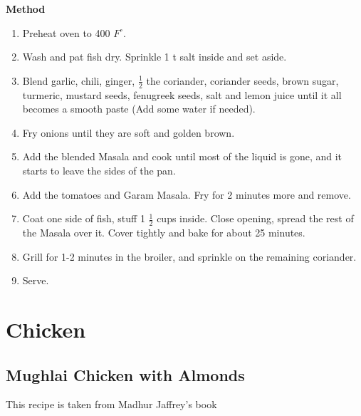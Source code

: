 {\bf Method}
\begin{enumerate}
\item Preheat oven to 400 $F^\circ$.
\item Wash and pat fish dry. Sprinkle 1 t salt inside and set aside.
\item Blend garlic, chili, ginger, $\frac{1}{2}$ the coriander, coriander seeds, brown
sugar, turmeric, mustard seeds, fenugreek seeds, salt and lemon juice until
it all becomes a smooth paste (Add some water if needed).
\item Fry onions until they are soft and golden brown.
\item Add the blended Masala and cook until most of the liquid is gone, and it
starts to leave the sides of the pan.
\item Add the tomatoes and Garam Masala.  Fry for 2 minutes more and remove.
\item Coat one side of fish, stuff 1 $\frac{1}{2}$ cups inside.  Close opening, spread
the rest of the Masala over it.  Cover tightly and bake for about 25 minutes.
\item Grill for 1-2 minutes in the broiler, and sprinkle on the remaining coriander.
\item Serve.
\end{enumerate}


\chapter{Chicken}

\section{Mughlai Chicken with Almonds}
  This recipe is taken from Madhur Jaffrey's book

